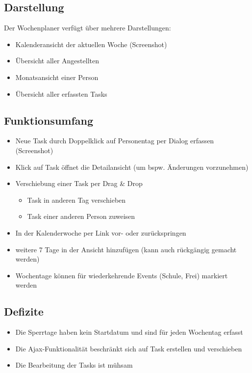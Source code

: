 \subsection{Darstellung}
Der Wochenplaner verfügt über mehrere Darstellungen:
\begin{itemize}
    \item Kalenderansicht der aktuellen Woche (Screenshot)
    \item Übersicht aller Angestellten
    \item Monatsansicht einer Person
    \item Übersicht aller erfassten Tasks
\end{itemize}

\subsection{Funktionsumfang}
\begin{itemize}
    \item Neue Task durch Doppelklick auf Personentag per Dialog erfassen (Screenshot)
    \item Klick auf Task öffnet die Detailansicht (um bspw. Änderungen vorzunehmen)
    \item Verschiebung einer Task per Drag \& Drop
    \begin{itemize}
        \item Task in anderen Tag verschieben
        \item Task einer anderen Person zuweisen
    \end{itemize}
    \item In der Kalenderwoche per Link vor- oder zurückspringen
    \item weitere 7 Tage in der Ansicht hinzufügen (kann auch rückgängig gemacht werden)
    \item Wochentage können für wiederkehrende Events (Schule, Frei) markiert werden
\end{itemize}
\subsection{Defizite}
    \begin{itemize}
        \item Die Sperrtage haben kein Startdatum und sind für jeden Wochentag erfasst
        \item Die Ajax-Funktionalität beschränkt sich auf Task erstellen und verschieben
        \item Die Bearbeitung der Tasks ist mühsam
    \end{itemize}

